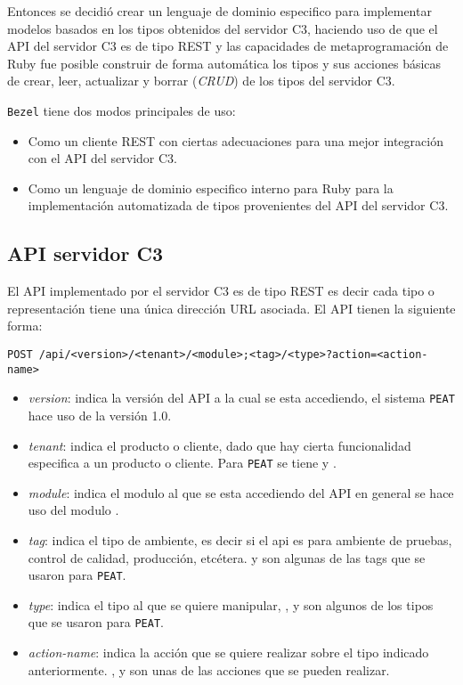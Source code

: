 Entonces se decidió crear un lenguaje de dominio especifico para implementar
modelos basados en los tipos obtenidos del servidor C3, haciendo uso de que el API
del servidor C3 es de tipo REST y las capacidades de metaprogramación de Ruby
fue posible construir de forma automática los tipos y sus acciones básicas
de crear, leer, actualizar y borrar (\textit{CRUD}) de los tipos del servidor C3.

\texttt{Bezel} tiene dos modos principales de uso:
\begin{itemize}
\item Como un cliente REST con ciertas adecuaciones para una mejor
  integración con el API del servidor C3.
\item Como un lenguaje de dominio especifico interno para Ruby para la
  implementación automatizada de tipos provenientes del API del servidor C3.
\end{itemize}

\subsection{API servidor C3}

El API implementado por el servidor C3 es de tipo REST es decir cada tipo
o representación tiene una única dirección URL asociada. El API tienen
la siguiente forma:

\begin{verbatim}
POST /api/<version>/<tenant>/<module>;<tag>/<type>?action=<action-name>
\end{verbatim}

\begin{itemize}
\item \textit{version}: indica la versión del API a la cual se esta
  accediendo, el sistema \texttt{PEAT} hace uso de la versión 1.0.
\item \textit{tenant}: indica el producto o cliente, dado que hay
  cierta funcionalidad especifica a un producto o cliente. Para
  \texttt{PEAT} se tiene  y .
\item \textit{module}: indica el modulo al que se esta accediendo del API
  en general se hace uso del modulo .
\item \textit{tag}: indica el tipo de ambiente, es decir si el api
  es para ambiente de pruebas, control de calidad, producción, etcétera.
   y  son algunas de las tags
  que se usaron para \texttt{PEAT}.
\item \textit{type}: indica el tipo al que se quiere manipular, ,
   y  son algunos
  de los tipos que se usaron para \texttt{PEAT}.
\item \textit{action-name}: indica la acción que se quiere realizar sobre
  el tipo indicado anteriormente. ,  y
   son unas de las acciones que se pueden realizar.
\end{itemize}

